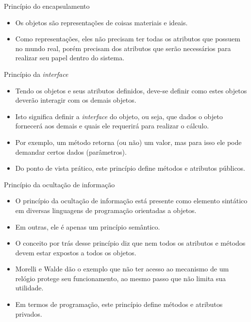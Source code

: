 \documentclass[11pt,justified]{beamer}
\begin{document}
\begin{frame}{Princípio do encapsulamento}
    \begin{itemize}
        \item Os objetos são representações de coisas materiais e ideais.
        \item Como representações, eles não precisam ter todas os atributos que possuem no mundo real, porém precisam dos atributos que serão necessários para realizar seu papel dentro do sistema.
    \end{itemize}
\end{frame}

\begin{frame}{Princípio da \textit{interface}}
    \begin{itemize}
        \item Tendo os objetos e seus atributos definidos, deve-se definir como estes objetos deverão interagir com os demais objetos.
        \item Isto significa definir a \textit{interface} do objeto, ou seja, que dados o objeto fornecerá aos demais e quais ele requerirá para realizar o cálculo.
        \item Por exemplo, um método retorna (ou não) um valor, mas para isso ele pode demandar certos dados (parâmetros).
        \item Do ponto de vista prático, este princípio define métodos e atributos públicos.
    \end{itemize}
\end{frame}

\begin{frame}{Princípio da ocultação de informação}
    \begin{itemize}
        \item O princípio da ocultação de informação está presente como elemento sintático em diversas linguagens de programação orientadas a objetos.
        \item Em outras, ele é apenas um princípio semântico.
        \item O conceito por trás desse princípio diz que nem todos os atributos e métodos devem estar expostos a todos os objetos.
        \item Morelli e Walde dão o exemplo que não ter acesso ao mecanismo de um relógio protege seu funcionamento, ao mesmo passo que não limita sua utilidade.
        \item Em termos de programação, este princípio define métodos e atributos privados.
    \end{itemize}
\end{frame}
\end{document}
